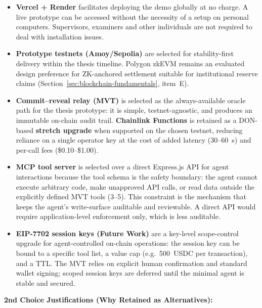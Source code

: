 \documentclass[12pt,a4paper]{report}
\begin{document}
\begin{itemize}[noitemsep]
\item \textbf{Vercel + Render} facilitates deploying the demo globally at no charge. A live prototype can be accessed without the necessity of a setup on personal computers. Supervisors, examiners and other individuals are not required to deal with installation issues.

\item \textbf{Prototype testnets (Amoy/Sepolia)} are selected for stability-first delivery within the thesis timeline. Polygon zkEVM remains an evaluated design preference for ZK-anchored settlement suitable for institutional reserve claims (Section~\ref{sec:blockchain-fundamentals}, item~E).

\item \textbf{Commit--reveal relay (MVT)} is selected as the always-available oracle path for the thesis prototype: it is simple, testnet-agnostic, and produces an immutable on-chain audit trail. \textbf{Chainlink Functions} is retained as a DON-based \textbf{stretch upgrade} when supported on the chosen testnet, reducing reliance on a single operator key at the cost of added latency (30--60~s) and per-call fees (\$0.10--\$1.00).

\item \textbf{MCP tool server} is selected over a direct Express.js API for agent interactions because the tool schema is the safety boundary: the agent cannot execute arbitrary code, make unapproved API calls, or read data outside the explicitly defined MVT tools (3--5). This constraint is the mechanism that keeps the agent's write-surface auditable and reviewable. A direct API would require application-level enforcement only, which is less auditable.

\item \textbf{EIP-7702 session keys (Future Work)} are a key-level scope-control upgrade for agent-controlled on-chain operations: the session key can be bound to a specific tool list, a value cap (e.g.\ 500~USDC per transaction), and a TTL. The MVT relies on explicit human confirmation and standard wallet signing; scoped session keys are deferred until the minimal agent is stable and secured.
\end{itemize}

\textbf{2nd Choice Justifications (Why Retained as Alternatives):}
\end{document}
